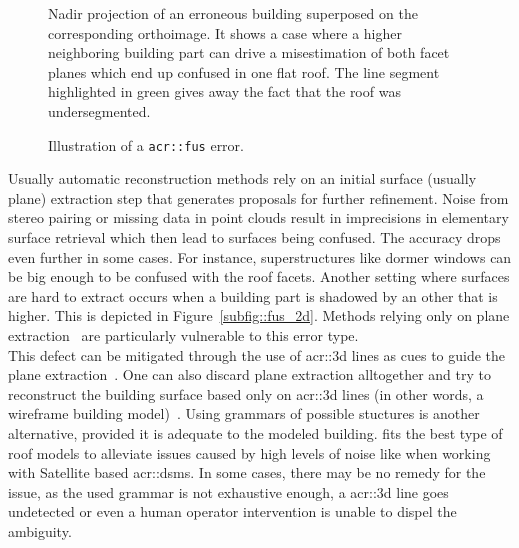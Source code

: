 \begin{figure}[htbp]
{\begin{subfloatrow}
{{                                        \label{subfig::fus_2d}
                                        Nadir projection of an erroneous building superposed on the corresponding orthoimage.
                                        It shows a case where a higher neighboring building part can drive a misestimation of both facet planes which end up confused in one flat roof.
                                        The line segment highlighted in green gives away the fact that the roof was undersegmented.
                                    }
                                }
                        \end{subfloatrow}
                    }{
                        \caption{
                            \label{fig::fus}
                            Illustration of a \texttt{\gls{acr::fus}} error.
                        }
                    }
                \end{figure}

                Usually automatic reconstruction methods rely on an initial surface (usually plane) extraction step that generates proposals for further refinement.
                Noise from stereo pairing or missing data in point clouds result in imprecisions in elementary surface retrieval which then lead to surfaces being confused.
                The accuracy drops even further in some cases.
                For instance, superstructures like dormer windows can be big enough to be confused with the roof facets.
                Another setting where surfaces are hard to extract occurs when a building part is shadowed by an other that is higher.
                This is depicted in Figure~\ref{subfig::fus_2d}.
                Methods relying only on plane extraction~\parencite{taillandier2004automatic,durupt2006automatic,nan2017polyfit} are particularly vulnerable to this error type.\\

                This defect can be mitigated through the use of \gls{acr::3d} lines as cues to guide the plane extraction~\parencite{zebedin2008fusion,sinha2009piecewise}.
                One can also discard plane extraction alltogether and try to reconstruct the building surface based only on \gls{acr::3d} lines (in other words, a wireframe building model)~\parencite{hofer2017efficient,langlois2019surface}.
                Using grammars of possible stuctures is another alternative, provided it is adequate to the modeled building.
                \textcite{lafarge2008structural} fits the best type of roof models to alleviate issues caused by high levels of noise like when working with Satellite based \glspl{acr::dsm}.
                In some cases, there may be no remedy for the issue, as the used grammar is not exhaustive enough, a \gls{acr::3d} line goes undetected or even a human operator intervention is unable to dispel the ambiguity.

